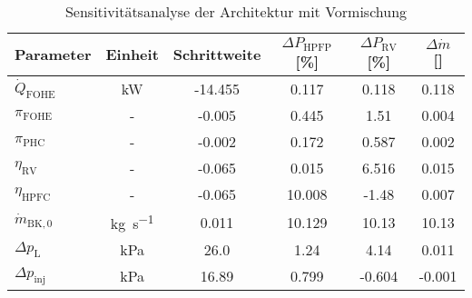 \begin{table}[ht]
    \centering
	\caption{Sensitivitätsanalyse der Architektur mit Vormischung}
	\begin{tabular} {|l|c|c|c|c|c|} \hline%
		Parameter & Einheit & Schrittweite & $ \Delta P_\mathrm{HPFP}$ [\%] & $ \Delta P_\mathrm{RV}$ [\%] & $ \Delta \dot{m}$ [\textperthousand] \\ \hline\hline%
$\dot{Q}_\mathrm{FOHE}$ & \si{\kilo\W} & -14.455 & 0.117 & 0.118 & 0.118 \\ \hline 
$\pi_\mathrm{FOHE}$ & - & -0.005 & 0.445 & 1.51 & 0.004 \\ \hline 
$\pi_\mathrm{PHC}$ & - & -0.002 & 0.172 & 0.587 & 0.002 \\ \hline 
$\eta_\mathrm{RV}$ & - & -0.065 & 0.015 & 6.516 & 0.015 \\ \hline 
$\eta_\mathrm{HPFC}$ & - & -0.065 & 10.008 & -1.48 & 0.007 \\ \hline 
$\dot{m}_\mathrm{BK,0}$ & \si{\kg\per\s} & 0.011 & 10.129 & 10.13 & 10.13 \\ \hline 
$\Delta p_\mathrm{L}$ & \si{\kilo\Pa} & 26.0 & 1.24 & 4.14 & 0.011 \\ \hline 
$\Delta p_\mathrm{inj}$ & \si{\kilo\Pa} & 16.89 & 0.799 & -0.604 & -0.001 \\ \hline 


	\end{tabular}	
    \label{Tab:sensdual}%
\end{table}
\FloatBarrier 

